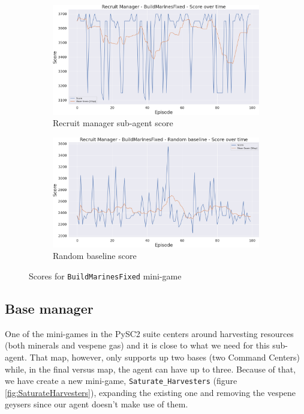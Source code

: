 \begin{figure}[t]
    \centering
    \begin{subfigure}[b]{0.495\textwidth}
        \includegraphics[width=1\textwidth]{figs/multi_dqn_army_recruit_manager/exploit/score.png}
        \caption{Recruit manager sub-agent score}
    \end{subfigure}
    \begin{subfigure}[b]{0.495\textwidth}
        \includegraphics[width=1\textwidth]{figs/multi_random_army_recruit_manager/exploit/score.png}
        \caption{Random baseline score}
    \end{subfigure}
    \caption{Scores for \texttt{BuildMarinesFixed} mini-game}
    \label{fig:BuildMarinesFixed_scores}
\end{figure}

\subsection{Base manager}

One of the mini-games in the PySC2 suite centers around harvesting resources (both minerals and vespene gas) and it is close to what we need for this sub-agent. That map, however, only supports up two bases (two Command Centers) while, in the final versus map, the agent can have up to three. Because of that, we have create a new mini-game, \texttt{Saturate\_Harvesters} (figure \ref{fig:SaturateHarvesters}), expanding the existing one and removing the vespene geysers since our agent doesn't make use of them.

